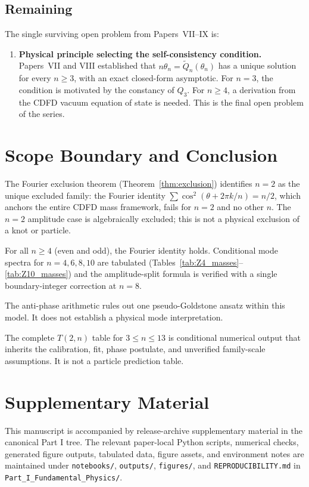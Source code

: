 \documentclass[11pt]{article}
\begin{document}
\subsection{Remaining}

The single surviving open problem from Papers~VII--IX is:

\begin{enumerate}
\item \textbf{Physical principle selecting the self-consistency
  condition.}
  Papers~VII and VIII established that $n\theta_n = \widetilde{Q}_n(\theta_n)$
  has a unique solution for every $n \geq 3$, with an exact closed-form
  asymptotic.
  For $n = 3$, the condition is motivated by the constancy of $Q_3$.
  For $n \geq 4$, a derivation from the CDFD vacuum equation of state
  is needed.
  This is the final open problem of the series.
\end{enumerate}


\section{Scope Boundary and Conclusion}

The Fourier exclusion theorem (Theorem~\ref{thm:exclusion}) identifies
$n = 2$ as the unique excluded family: the Fourier identity
$\sum \cos^2(\theta + 2\pi k/n) = n/2$, which anchors the entire CDFD
mass framework, fails for $n = 2$ and no other $n$.
The $n=2$ amplitude case is algebraically excluded; this is not a physical
exclusion of a knot or particle.

For all $n \geq 4$ (even and odd), the Fourier identity holds. Conditional
mode spectra for $n = 4, 6, 8, 10$ are tabulated
(Tables~\ref{tab:Z4_masses}--\ref{tab:Z10_masses}) and the
amplitude-split formula is verified with a single boundary-integer
correction at $n = 8$.

The anti-phase arithmetic rules out one pseudo-Goldstone ansatz within this
model. It does not establish a physical mode interpretation.

The complete $T(2,n)$ table for $3 \leq n \leq 13$ is conditional numerical
output that inherits the calibration, fit, phase postulate, and unverified
family-scale assumptions. It is not a particle prediction table.


\section*{Supplementary Material}

This manuscript is accompanied by release-archive supplementary material in
the canonical Part I tree. The relevant paper-local Python scripts, numerical checks, generated figure outputs,
tabulated data, figure assets, and environment notes are maintained under
\texttt{notebooks/}, \texttt{outputs/}, \texttt{figures/}, and
\texttt{REPRODUCIBILITY.md} in \texttt{Part\_I\_Fundamental\_Physics/}.
\end{document}
